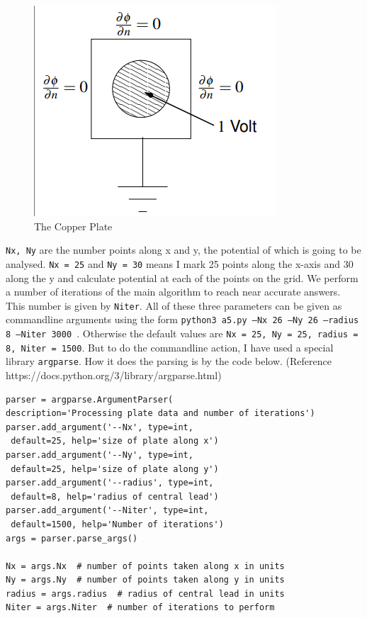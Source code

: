 \documentclass[11pt, a4paper]{article}
\begin{document}
\begin{figure}[!tbh]
   	\centering
  \includegraphics[scale=0.5]{plate.png} 
    \caption{The Copper Plate} 	\label{The Plate}
   \end{figure} 

\texttt{Nx, Ny} are the number points along x and y, the potential of which is going to be analysed. \texttt{Nx = 25} and \texttt{Ny = 30} means I mark 25 points along the x-axis and 30 along the y and calculate potential at each of the points on the grid. We perform a number of iterations of the main algorithm to reach near accurate answers. This number is given by \texttt{Niter}. All of these three parameters can be given as commandline arguments using the form \texttt{python3 a5.py --Nx 26 --Ny 26 --radius 8 --Niter 3000
}. Otherwise the default values are \texttt{Nx = 25, Ny = 25, radius = 8, Niter = 1500}. 
But to do the commandline action, I have used a special library \texttt{argparse}. How it does the parsing is by the code below. (Reference {https://docs.python.org/3/library/argparse.html}) 
\begin{verbatim}
parser = argparse.ArgumentParser(
description='Processing plate data and number of iterations')
parser.add_argument('--Nx', type=int,
 default=25, help='size of plate along x')
parser.add_argument('--Ny', type=int,
 default=25, help='size of plate along y')
parser.add_argument('--radius', type=int,
 default=8, help='radius of central lead')
parser.add_argument('--Niter', type=int,
 default=1500, help='Number of iterations')
args = parser.parse_args()

Nx = args.Nx  # number of points taken along x in units
Ny = args.Ny  # number of points taken along y in units
radius = args.radius  # radius of central lead in units
Niter = args.Niter  # number of iterations to perform
\end{verbatim}
\end{document}
